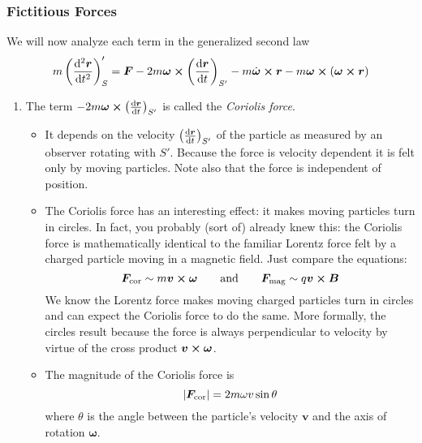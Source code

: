 \documentclass[11pt, a4paper]{article}
\newcommand{\eqtext}[1]{\qquad \text{#1} \qquad}
\newcommand{\bdot}[1]{\dot{\bm{#1}}}
\begin{document}
\subsubsection{Fictitious Forces}
We will now analyze each term in the generalized second law
\begin{equation*}
	m\left(\dv[2]{\bm{r}}{t}\right)_{S}' = \bm{F} - 2m\bm{\omega} \cross  \left(\dv{\bm{r}}{t}\right)_{S'} - m\bdot{\omega} \cross \bm{r} - m\bm{\omega} \cross (\bm{\omega} \cross \bm{r})
\end{equation*}
\begin{enumerate}
	\item The term $ -2m \bm{\omega} \cross \left(\dv{\bm{r}}{t}\right)_{S'} $ is called the \textit{Coriolis force}.
	\begin{itemize}
		\item It depends on the velocity $ \left(\dv{\bm{r}}{t}\right)_{S'} $ of the particle as measured by an observer rotating with $ S' $. Because the force is velocity dependent it is felt only by moving particles. Note also that the force is independent of position.
		
		\item The Coriolis force has an interesting effect: it makes moving particles turn in circles. In fact, you probably (sort of) already knew this: the Coriolis force is mathematically identical to the familiar Lorentz force felt by a charged particle moving in a magnetic field. Just compare the equations:
		\begin{equation*}
			\bm{F}_{\text{cor}} \sim m \bm{v} \cross \bm{\omega} \eqtext{and} \bm{F}_{\text{mag}} \sim q \bm{v} \cross \bm{B}
		\end{equation*}
		We know the Lorentz force makes moving charged particles turn in circles and can expect the Coriolis force to do the same. More formally, the circles result because the force is always perpendicular to velocity by virtue of the cross product $ \bm{v} \cross \bm{\omega} $.
		
		\item The magnitude of the Coriolis force is
		\begin{equation*}
			\abs{\bm{F}_{\text{cor}}} = 2 m \omega v \sin \theta
		\end{equation*}
		where $ \theta $ is the angle between the particle's velocity $ \bm{v} $ and the axis of rotation $ \bm{\omega} $. 
		
	\end{itemize}
	

\end{enumerate}
\end{document}
